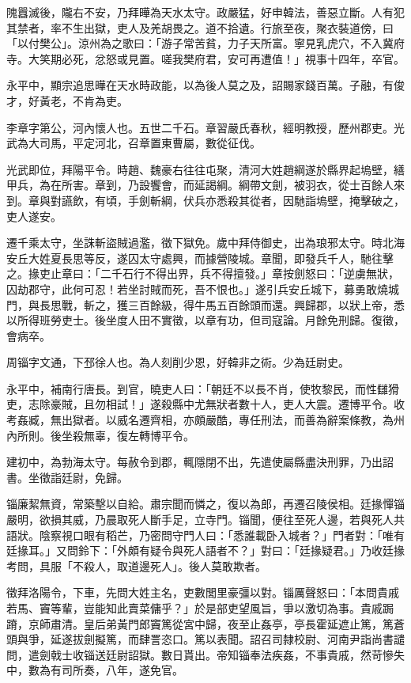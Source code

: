 \begin{pinyinscope}
隗囂滅後，隴右不安，乃拜曄為天水太守。政嚴猛，好申韓法，善惡立斷。人有犯其禁者，率不生出獄，吏人及羌胡畏之。道不拾遺。行旅至夜，聚衣裝道傍，曰「以付樊公」。涼州為之歌曰：「游子常苦貧，力子天所富。寧見乳虎穴，不入冀府寺。大笑期必死，忿怒或見置。嗟我樊府君，安可再遭值！」視事十四年，卒官。

永平中，顯宗追思曄在天水時政能，以為後人莫之及，詔賜家錢百萬。子融，有俊才，好黃老，不肯為吏。

李章字第公，河內懷人也。五世二千石。章習嚴氏春秋，經明教授，歷州郡吏。光武為大司馬，平定河北，召章置東曹屬，數從征伐。

光武即位，拜陽平令。時趙、魏豪右往往屯聚，清河大姓趙綱遂於縣界起塢壁，繕甲兵，為在所害。章到，乃設饗會，而延謁綱。綱帶文劍，被羽衣，從士百餘人來到。章與對讌飲，有頃，手劍斬綱，伏兵亦悉殺其從者，因馳詣塢壁，掩擊破之，吏人遂安。

遷千乘太守，坐誅斬盜賊過濫，徵下獄免。歲中拜侍御史，出為琅邪太守。時北海安丘大姓夏長思等反，遂囚太守處興，而據營陵城。章聞，即發兵千人，馳往擊之。掾吏止章曰：「二千石行不得出界，兵不得擅發。」章按劍怒曰：「逆虜無狀，囚劫郡守，此何可忍！若坐討賊而死，吾不恨也。」遂引兵安丘城下，募勇敢燒城門，與長思戰，斬之，獲三百餘級，得牛馬五百餘頭而還。興歸郡，以狀上帝，悉以所得班勞吏士。後坐度人田不實徵，以章有功，但司寇論。月餘免刑歸。復徵，會病卒。

周锱字文通，下邳徐人也。為人刻削少恩，好韓非之術。少為廷尉史。

永平中，補南行唐長。到官，曉吏人曰：「朝廷不以長不肖，使牧黎民，而性讎猾吏，志除豪賊，且勿相試！」遂殺縣中尤無狀者數十人，吏人大震。遷博平令。收考姦臧，無出獄者。以威名遷齊相，亦頗嚴酷，專任刑法，而善為辭案條教，為州內所則。後坐殺無辜，復左轉博平令。

建初中，為勃海太守。每赦令到郡，輒隱閉不出，先遣使屬縣盡決刑罪，乃出詔書。坐徵詣廷尉，免歸。

锱廉絜無資，常築墼以自給。肅宗聞而憐之，復以為郎，再遷召陵侯相。廷掾憚锱嚴明，欲損其威，乃晨取死人斷手足，立寺門。锱聞，便往至死人邊，若與死人共語狀。陰察視口眼有稻芒，乃密問守門人曰：「悉誰載卧入城者？」門者對：「唯有廷掾耳。」又問鈴下：「外頗有疑令與死人語者不？」對曰：「廷掾疑君。」乃收廷掾考問，具服「不殺人，取道邊死人」。後人莫敢欺者。

徵拜洛陽令，下車，先問大姓主名，吏數閭里豪彊以對。锱厲聲怒曰：「本問貴戚若馬、竇等輩，豈能知此賣菜傭乎？」於是部吏望風旨，爭以激切為事。貴戚跼蹐，京師肅清。皇后弟黃門郎竇篤從宮中歸，夜至止姦亭，亭長霍延遮止篤，篤蒼頭與爭，延遂拔劍擬篤，而肆詈恣口。篤以表聞。詔召司隸校尉、河南尹詣尚書譴問，遣劍戟士收锱送廷尉詔獄。數日貰出。帝知锱奉法疾姦，不事貴戚，然苛慘失中，數為有司所奏，八年，遂免官。


\end{pinyinscope}
